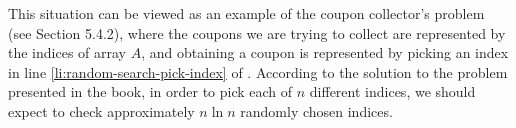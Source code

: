 This situation can be viewed as an example of the coupon collector's problem (see Section 5.4.2), where the coupons we are trying to collect are represented by the indices of array $A$, and obtaining a coupon is represented by picking an index in line \ref{li:random-search-pick-index} of .
According to the solution to the problem presented in the book, in order to pick each of $n$ different indices, we should expect to check approximately $n\ln n$ randomly chosen indices.
